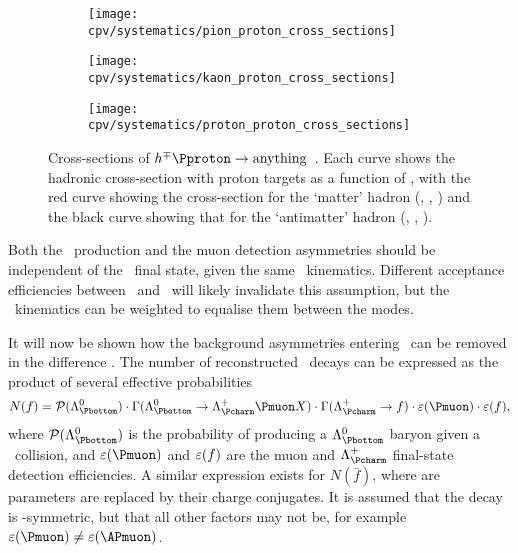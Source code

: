 \begin{figure}
  \begin{subfigure}{0.5\textwidth}
    \centering
    \texttt{[image: cpv/systematics/pion\_proton\_cross\_sections]}
    \caption{}
    \label{fig:cpv:syst:asym:xsecs:pion}
  \end{subfigure}
  \begin{subfigure}{0.5\textwidth}
    \centering
    \texttt{[image: cpv/systematics/kaon\_proton\_cross\_sections]}
    \caption{}
    \label{fig:cpv:syst:asym:xsecs:kaon}
  \end{subfigure}
  \begin{subfigure}{0.5\textwidth}
    \centering
    \texttt{[image: cpv/systematics/proton\_proton\_cross\_sections]}
    \caption{}
    \label{fig:cpv:syst:asym:xsecs:proton}
  \end{subfigure}
  \caption{%
    Cross-sections of $h^{\mp}\Pproton \to \text{anything}$~\cite{PDG2014}.
    Each curve shows the hadronic cross-section with proton targets as a 
    function of \sqrts, with the red curve showing the cross-section for the 
    `matter' hadron (\PKplus, \Ppiplus, \Pproton) and the black curve showing 
    that for the `antimatter' hadron (\PKminus, \Ppiminus, \APproton).
  }
  \label{fig:cpv:syst:asym:xsecs}
\end{figure}

Both the \PLambdab\ production and the muon detection asymmetries should be 
independent of the \PLambdac\ final state, given the same \PLambdac\ 
kinematics.
Different acceptance efficiencies between \pKK\ and \ppipi\ will likely 
invalidate this assumption, but the \PLambdac\ kinematics can be weighted to 
equalise them between the modes.

It will now be shown how the background asymmetries entering \ARaw\ can be 
removed in the difference \dACP\@.
The number of reconstructed \LcTof\ decays can be expressed as the product of 
several effective probabilities
\begin{equation}
  N(f) = \prob(\PLambdab)\cdot
         \Gamma(\LbToLcmuX)\cdot
         \Gamma(\LcTof)\cdot
         \eff(\Pmuon)\cdot
         \eff(f),
  \label{eqn:cpv:theory:yield}
\end{equation}
where $\prob(\PLambdab)$ is the probability of producing a $\PLambdab$ baryon 
given a \pp\ collision, and $\eff(\Pmuon)$ and $\varepsilon(f)$ are the muon and 
$\PLambdac$ final-state detection efficiencies.
A similar expression exists for $N(\bar{f})$, where are parameters are replaced 
by their charge conjugates.
It is assumed that the \LbToLcmuX decay is \CP-symmetric, but that all other 
factors may not be, for example $\eff(\Pmuon) \neq \eff(\APmuon)$.

